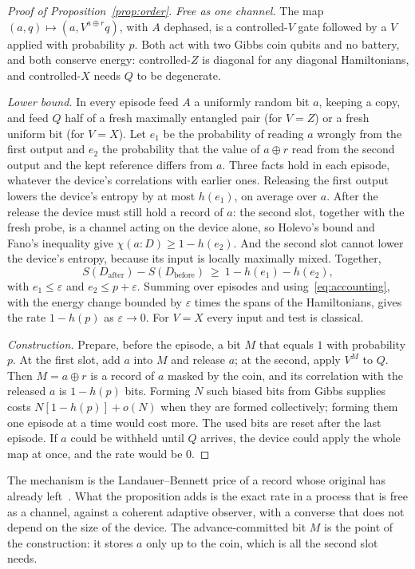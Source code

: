 \documentclass[11pt]{article}
\theoremstyle{definition}
\theoremstyle{remark}
\begin{document}
\begin{proof}[Proof of Proposition~\ref{prop:order}]
\emph{Free as one channel.} The map $(a,q)\mapsto(a,V^{a\oplus r}q)$, with $A$ dephased, is a controlled-$V$ gate followed by a $V$ applied with probability $p$. Both act with two Gibbs coin qubits and no battery, and both conserve energy: controlled-$Z$ is diagonal for any diagonal Hamiltonians, and controlled-$X$ needs $Q$ to be degenerate.

\emph{Lower bound.} In every episode feed $A$ a uniformly random bit $a$, keeping a copy, and feed $Q$ half of a fresh maximally entangled pair (for $V=Z$) or a fresh uniform bit (for $V=X$). Let $e_1$ be the probability of reading $a$ wrongly from the first output and $e_2$ the probability that the value of $a\oplus r$ read from the second output and the kept reference differs from $a$. Three facts hold in each episode, whatever the device's correlations with earlier ones. Releasing the first output lowers the device's entropy by at most $h(e_1)$, on average over $a$. After the release the device must still hold a record of $a$: the second slot, together with the fresh probe, is a channel acting on the device alone, so Holevo's bound and Fano's inequality give $\chi(a{:}D)\ge1-h(e_2)$. And the second slot cannot lower the device's entropy, because its input is locally maximally mixed. Together,
\[
S(D_{\mathrm{after}})-S(D_{\mathrm{before}})\ \ge\ 1-h(e_1)-h(e_2),
\]
with $e_1\le\varepsilon$ and $e_2\le p+\varepsilon$. Summing over episodes and using~\eqref{eq:accounting}, with the energy change bounded by $\varepsilon$ times the spans of the Hamiltonians, gives the rate $1-h(p)$ as $\varepsilon\to0$. For $V=X$ every input and test is classical.

\emph{Construction.} Prepare, before the episode, a bit $M$ that equals $1$ with probability $p$. At the first slot, add $a$ into $M$ and release $a$; at the second, apply $V^M$ to $Q$. Then $M=a\oplus r$ is a record of $a$ masked by the coin, and its correlation with the released $a$ is $1-h(p)$ bits. Forming $N$ such biased bits from Gibbs supplies costs $N[1-h(p)]+o(N)$ when they are formed collectively; forming them one episode at a time would cost more. The used bits are reset after the last episode. If $a$ could be withheld until $Q$ arrives, the device could apply the whole map at once, and the rate would be $0$.
\end{proof}

The mechanism is the Landauer--Bennett price of a record whose original has already left~\cite{Bennett73,BMC18}. What the proposition adds is the exact rate in a process that is free as a channel, against a coherent adaptive observer, with a converse that does not depend on the size of the device. The advance-committed bit $M$ is the point of the construction: it stores $a$ only up to the coin, which is all the second slot needs.
\end{document}

